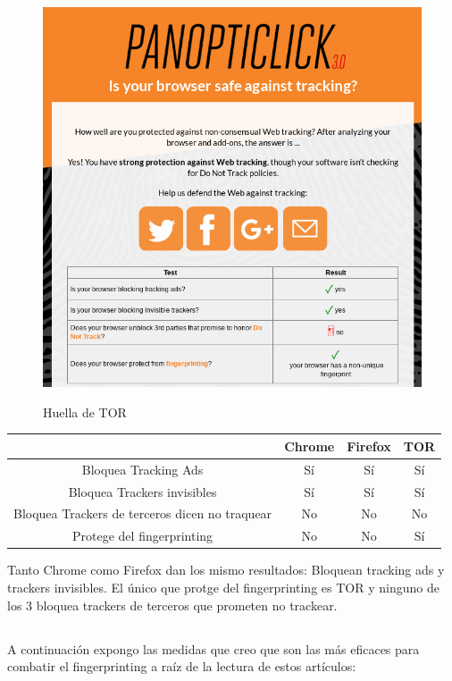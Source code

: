 \documentclass[10pt,a4paper]{article}
\begin{document}
\begin{figure}[H]
  \centering
  \includegraphics[scale=0.4]{p_tor.png}\\
  \caption{Huella de TOR}
  \label{fig:object}
\end{figure}

    \vspace{1cm}
    \begin{center}
		\begin{tabular}{| c | c | c | c |}
	    \hline
     		& Chrome & Firefox & TOR\\ \hline
	    Bloquea Tracking Ads & Sí & Sí & Sí \\ \hline
    	Bloquea Trackers invisibles & Sí & Sí & Sí \\ \hline
	    Bloquea Trackers de terceros dicen no traquear & No & No & No \\ \hline
    	Protege del fingerprinting & No & No & Sí \\
    	\hline
	    \end{tabular}    
    \end{center}

Tanto Chrome como Firefox dan los mismo resultados: Bloquean tracking ads y trackers invisibles. El único que protge del fingerprinting es TOR y ninguno de los 3 bloquea trackers de terceros que prometen no trackear.
\subsection{}
A continuación expongo las medidas que creo que son las más eficaces para combatir el fingerprinting a raíz de la lectura de estos artículos:\\
\end{document}
